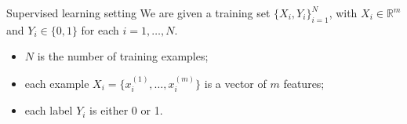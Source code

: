 \bgroup
\begin{frame}{Supervised learning setting}
We are given a training set $\{X_i, Y_i\}_{i=1}^N$, with $X_i \in \mathbb{R}^m$ and $Y_i \in \{0, 1\}$ for each $i=1,\ldots,N$.
\begin{itemize}
\item $N$ is the number of training examples;
\item each example $X_i = \{x_i^{(1)}, \ldots , x_i^{(m)}\}$ is a vector of $m$ features;
\item each label $Y_i$ is either 0 or 1.
\end{itemize}
\end{frame}
\egroup